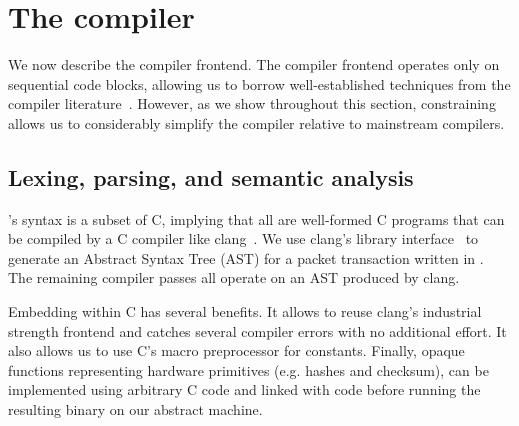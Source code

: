 \section{The \pktlanguage compiler}
\label{s:compiler}

We now describe the \pktlanguage compiler frontend. The compiler frontend
operates only on sequential code blocks, allowing us to borrow well-established
techniques from the compiler literature~\cite{muchnik}. However, as we show
throughout this section, constraining \pktlanguage allows us to considerably
simplify the compiler relative to mainstream compilers.

\subsection{Lexing, parsing, and semantic analysis}
\pktlanguage's syntax is a subset of C, implying that all \pktlanguage are
well-formed C programs that can be compiled by a C compiler like
clang~\cite{clang}. We use clang's library interface~\cite{libclang} to
generate an Abstract Syntax Tree (AST) for a packet transaction written in
\pktlanguage. The remaining compiler passes all operate on an AST produced by
clang.

Embedding \pktlanguage within C has several benefits. It allows to reuse
clang's industrial strength frontend and catches several compiler errors with
no additional effort.  It also allows us to use C's macro preprocessor for
constants. Finally, opaque functions representing hardware primitives (e.g.
hashes and checksum), can be implemented using arbitrary C code and linked with
\pktlanguage code before running the resulting binary on our abstract machine.

